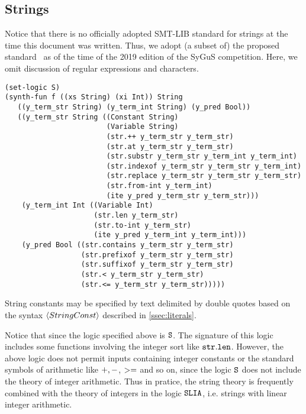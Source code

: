 \documentclass[english,a4paper,10pt]{article}
\begin{document}
\begin{appendix}
\subsection{Strings}

Notice that there is no
officially adopted SMT-LIB standard for strings at the time
this document was written.
Thus, we adopt (a subset of) the proposed standard~\cite{smtlibStrings}
as of the time of the 2019 edition of the SyGuS competition.
Here, we omit discussion of regular expressions and characters.
\begin{lstlisting}[basicstyle={\ttfamily}]
(set-logic S)
(synth-fun f ((xs String) (xi Int)) String
   ((y_term_str String) (y_term_int String) (y_pred Bool))
   ((y_term_str String ((Constant String)
                        (Variable String)
                        (str.++ y_term_str y_term_str)
                        (str.at y_term_str y_term_str)
                        (str.substr y_term_str y_term_int y_term_int)
                        (str.indexof y_term_str y_term_str y_term_int)
                        (str.replace y_term_str y_term_str y_term_str)
                        (str.from-int y_term_int)
                        (ite y_pred y_term_str y_term_str)))
    (y_term_int Int ((Variable Int)
                     (str.len y_term_str)
                     (str.to-int y_term_str)
                     (ite y_pred y_term_int y_term_int)))
    (y_pred Bool ((str.contains y_term_str y_term_str)
                  (str.prefixof y_term_str y_term_str)
                  (str.suffixof y_term_str y_term_str)
                  (str.< y_term_str y_term_str)
                  (str.<= y_term_str y_term_str)))))
\end{lstlisting}
String constants may be specified by text delimited by double quotes
based on the syntax $\left\langle StringConst\right\rangle$ described in \cref{ssec:literals}.

Notice that since the logic specified above is ${\tt S}$.
The signature of this logic includes 
some functions involving the integer sort like
${\tt str.len}$.
However, the above logic does not permit inputs containing
integer constants or the standard symbols of arithmetic like 
${\tt +}, {\tt -}$, ${\tt >=}$ and so on, since the logic ${\tt S}$
does not include the theory of integer arithmetic.
Thus in pratice, 
the string theory is frequently combined with the theory of integers
in the logic ${\tt SLIA}$, i.e. strings with linear integer arithmetic.



\end{appendix}
\end{document}
